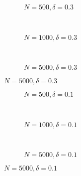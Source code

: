 \documentclass{beamer}
\begin{document}
\begin{frame}
\begin{figure}[h]
  \scriptsize
  \begingroup
  \centering
  \begin{subfigure}[b]{0.31\textwidth}
\caption{\footnotesize $N=500, \delta = 0.3$}
  
  \end{subfigure}
  ~
  \begin{subfigure}[b]{0.31\textwidth}
    \caption{\footnotesize $N=1000, \delta = 0.3$} 
  
  \end{subfigure}
  ~
  \begin{subfigure}[b]{0.31\textwidth}
\caption{\footnotesize $N=5000, \delta = 0.3$}
  
  \end{subfigure}
\endgroup
\end{figure}
\end{frame}
\begin{frame}
  \begin{center}
    {}
  \end{center}
\end{frame}
\begin{frame}
\begin{figure}[h]
  \scriptsize
  \begingroup
  \centering
  \begin{subfigure}[b]{0.31\textwidth}
\caption{\footnotesize $N=500, \delta = 0.1$}
  
  \end{subfigure}
  ~
  \begin{subfigure}[b]{0.31\textwidth}
    \caption{\footnotesize $N=1000, \delta = 0.1$} 
  
  \end{subfigure}
  ~
  \begin{subfigure}[b]{0.31\textwidth}
\caption{\footnotesize $N=5000, \delta = 0.1$}
  
  \end{subfigure}
\endgroup
\end{figure}
\end{frame}
\end{document}
